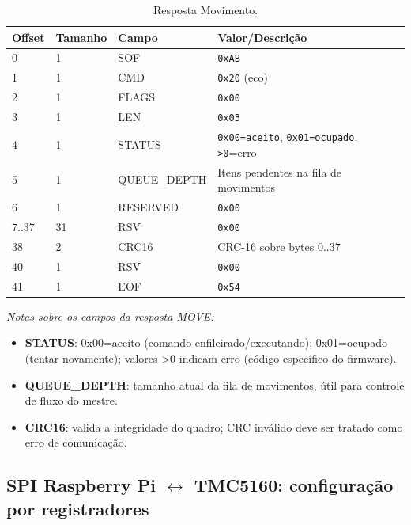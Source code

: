 \begin{table}[H]
  \centering
  \caption{Resposta Movimento.}
  \label{tab:spi-move-rsp}
  \setlength{\tabcolsep}{4pt}\footnotesize
  \begin{tabularx}{\textwidth}{lllX}
    \toprule
    Offset & Tamanho & Campo & Valor/Descri\c{c}\~ao \\
    \midrule
    0 & 1 & SOF & \texttt{0xAB} \\
    1 & 1 & CMD & \texttt{0x20} (eco) \\
    2 & 1 & FLAGS & \texttt{0x00} \\
    3 & 1 & LEN & \texttt{0x03} \\
    4 & 1 & STATUS & \texttt{0x00=aceito}, \texttt{0x01=ocupado}, \texttt{\textgreater 0}=erro \\
    5 & 1 & QUEUE\_DEPTH & Itens pendentes na fila de movimentos \\
    6 & 1 & RESERVED & \texttt{0x00} \\
    7..37 & 31 & RSV & \texttt{0x00} \\
    38 & 2 & CRC16 & CRC-16 sobre bytes 0..37 \\
    40 & 1 & RSV & \texttt{0x00} \\
    41 & 1 & EOF & \texttt{0x54} \\
    \bottomrule
  \end{tabularx}
\end{table}

\vspace{2mm}
\noindent\footnotesize\textit{Notas sobre os campos da resposta MOVE:}
\begin{itemize}
  \item \textbf{STATUS}: 0x00=aceito (comando enfileirado/executando); 0x01=ocupado (tentar novamente); valores \textgreater 0 indicam erro (código específico do firmware).
  \item \textbf{QUEUE\_DEPTH}: tamanho atual da fila de movimentos, útil para controle de fluxo do mestre.
  \item \textbf{CRC16}: valida a integridade do quadro; CRC inválido deve ser tratado como erro de comunicação.
\end{itemize}

\FloatBarrier

\FloatBarrier

\subsection*{SPI Raspberry Pi \texorpdfstring{$\leftrightarrow$}{<->} TMC5160: configuração por registradores}

